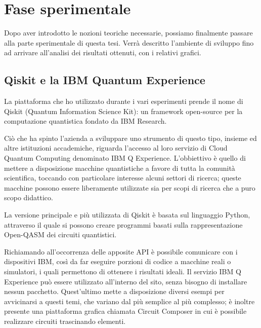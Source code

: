 \chapter{Fase sperimentale}
Dopo aver introdotto le nozioni teoriche necessarie, possiamo finalmente passare alla parte sperimentale di questa tesi. Verrà descritto l'ambiente di sviluppo fino ad arrivare all'analisi dei risultati ottenuti, con i relativi grafici.

\section{Qiskit e la IBM Quantum Experience}
La piattaforma che ho utilizzato durante i vari esperimenti prende il nome di Qiskit (Quantum Information Science Kit): un framework open-source per la computazione quantistica fondato da IBM Research.

Ciò che ha spinto l'azienda a sviluppare uno strumento di questo tipo, insieme ed altre istituzioni accademiche, riguarda l'accesso al loro servizio di Cloud Quantum Computing denominato IBM Q Experience.
L'obbiettivo è quello di mettere a disposizione macchine quantistiche a favore di tutta la comunità scientifica, toccando con particolare interesse alcuni settori di ricerca; queste macchine possono essere liberamente utilizzate sia per scopi di ricerca che a puro scopo didattico.

La versione principale e più utilizzata di Qiskit è basata sul linguaggio Python, attraverso il quale si possono creare programmi basati sulla rappresentazione Open-QASM \cite{larose2019articolo, assembly2017articolo} dei circuiti quantistici.

Richiamando all'occorrenza delle apposite API \cite{qiskit2018articolo} è possibile comunicare con i dispositivi IBM, così da far eseguire porzioni di codice a macchine reali o simulatori, i quali permettono di ottenere i risultati ideali.
Il servizio IBM Q Experience può essere utilizzato all'interno del sito, senza bisogno di installare nessun pacchetto.
Quest'ultimo mette a disposizione diversi esempi per avvicinarsi a questi temi, che variano dal più semplice al più complesso; è inoltre presente una piattaforma grafica chiamata Circuit Composer in cui è possibile realizzare circuiti trascinando elementi.

